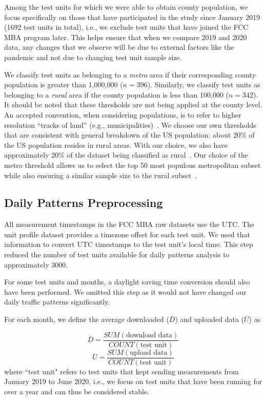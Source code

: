 \documentclass[conference,10pt]{IEEEtran}
\begin{document}
Among the test units for which we were able to obtain county population, we focus specifically on those that have participated in the study since January 2019 (1692 test units in total), i.e., we exclude test units that have joined the \gls{FCC} \gls{MBA} program later. This helps ensure that when we compare 2019 and 2020 data, any changes that we observe will be due to external factors like the pandemic and not due to changing test unit sample size.

We classify test units as belonging to a \emph{metro} area if their corresponding county population is greater than 1,000,000 ($n=396$). Similarly, we classify test units as belonging to a \emph{rural} area if the county population is less than 100,000 ($n=342$). It should be noted that these thresholds are not being applied at the county level. An accepted convention, when considering populations, is to refer to higher resolution ``tracks of land'' (e.g., municipalities)~\cite{censusMSA}. We choose our own thresholds that are consistent with general breakdown of the \gls{US} population: about 20\% of the \gls{US} population resides in rural areas. With our choice, we also have approximately 20\% of the dataset being classified as rural~\cite{metroRural}. Our choice of the metro threshold allows us to select the top 50 most populous metropolitan subset while also ensuring a similar sample size to the rural subset~\cite{censusMSA}.

\subsection{Daily Patterns Preprocessing}

All measurement timestamps in the \gls{FCC} \gls{MBA} raw datasets use the \gls{UTC}. The unit profile dataset provides a timezone offset for each test unit. We used that information to convert \gls{UTC} timestamps to the test unit's local time. This step reduced the number of test units available for daily patterns analysis to approximately 3000.

For some test units and months, a daylight saving time conversion should also have been performed. We omitted this step as it would not have changed our daily traffic patterns significantly.

For each month, we define the average downloaded ($\overline{D}$) and uploaded data ($\overline{U}$) as

\begin{equation}
    \overline{D} =\frac{SUM(\text{download data})}{COUNT(\text{test unit})}
\end{equation}
\begin{equation}
    \overline{U} =\frac{SUM(\text{upload data})}{COUNT(\text{test unit})}
\end{equation}
where ``test unit" refers to test units that kept sending measurements from January 2019 to June 2020, i.e., we focus on test units that have been running for over a year and can thus be considered stable.
\end{document}
